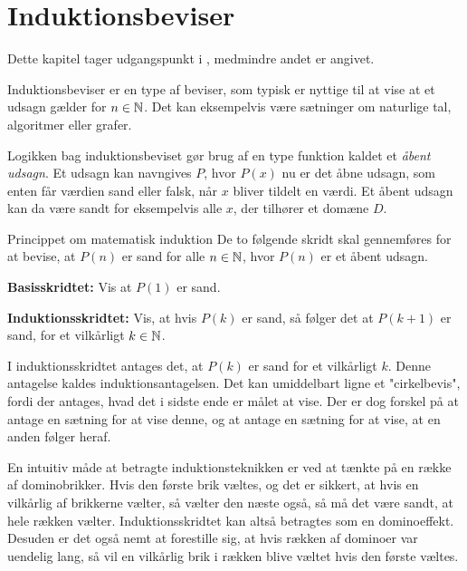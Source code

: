 \chapter{Induktionsbeviser}

Dette kapitel tager udgangspunkt i \citep{dmat}, medmindre andet er angivet.

Induktionsbeviser er en type af beviser, som typisk er nyttige til at vise at et udsagn gælder for $n \in \mathbb{N}$.
Det kan eksempelvis være sætninger om naturlige tal, algoritmer eller grafer.

Logikken bag induktionsbeviset gør brug af en type funktion kaldet et \textit{åbent udsagn}.
Et udsagn kan navngives $P$, hvor $P(x)$ nu er det åbne udsagn, som enten får værdien sand eller falsk, når $x$ bliver tildelt en værdi.
Et åbent udsagn kan da være sandt for eksempelvis alle $x$, der tilhører et domæne $D$.

\begin{theorembox}{Princippet om matematisk induktion}
	De to følgende skridt skal gennemføres for at bevise, at $P(n)$ er sand for alle $n \in \mathbb{N}$, hvor $P(n)$ er et åbent udsagn.

	\textbf{Basisskridtet:} \quad 
	Vis at $P(1)$ er sand.
	
	\textbf{Induktionsskridtet:} \quad 
	Vis, at hvis $P(k)$ er sand, så følger det at $P(k + 1)$ er sand, for et vilkårligt $k \in \mathbb{N}$.
\end{theorembox}

I induktionsskridtet antages det, at $P(k)$ er sand for et vilkårligt $k$.
Denne antagelse kaldes induktionsantagelsen.
Det kan umiddelbart ligne et "cirkelbevis", fordi der antages, hvad det i sidste ende er målet at vise.
Der er dog forskel på at antage en sætning for at vise denne, og at antage en sætning for at vise, at en anden følger heraf.

En intuitiv måde at betragte induktionsteknikken er ved at tænkte på en række af dominobrikker.
Hvis den første brik væltes, og det er sikkert, at hvis en vilkårlig af brikkerne vælter, så vælter den næste også, så må det være sandt, at hele rækken vælter.
Induktionsskridtet kan altså betragtes som en dominoeffekt.
Desuden er det også nemt at forestille sig, at hvis rækken af dominoer var uendelig lang, så vil en vilkårlig brik i rækken blive væltet hvis den første væltes. 

